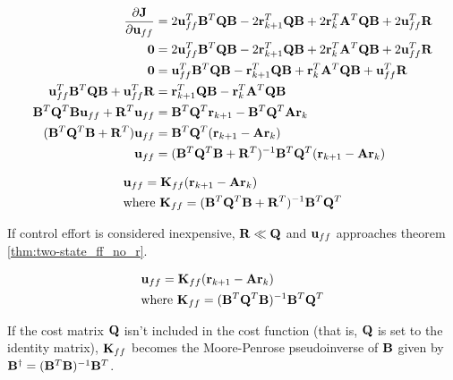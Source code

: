 \begin{align*}
  \frac{\partial\mathbf{J}}{\partial\mathbf{u}_{ff}} &=
    2\mathbf{u}_{ff}^T\mathbf{B}^T\mathbf{Q}\mathbf{B} - 2\mathbf{r}_{k+1}^T\mathbf{Q}\mathbf{B} +
    2\mathbf{r}_k^T\mathbf{A}^T\mathbf{Q}\mathbf{B} + 2\mathbf{u}_{ff}^T\mathbf{R} \\
  \mathbf{0} &= 2\mathbf{u}_{ff}^T\mathbf{B}^T\mathbf{Q}\mathbf{B} -
    2\mathbf{r}_{k+1}^T\mathbf{Q}\mathbf{B} + 2\mathbf{r}_k^T\mathbf{A}^T\mathbf{Q}\mathbf{B} +
    2\mathbf{u}_{ff}^T\mathbf{R} \\
  \mathbf{0} &= \mathbf{u}_{ff}^T\mathbf{B}^T\mathbf{Q}\mathbf{B} -
    \mathbf{r}_{k+1}^T\mathbf{Q}\mathbf{B} + \mathbf{r}_k^T\mathbf{A}^T\mathbf{Q}\mathbf{B} +
    \mathbf{u}_{ff}^T\mathbf{R} \\
  \mathbf{u}_{ff}^T\mathbf{B}^T\mathbf{Q}\mathbf{B} + \mathbf{u}_{ff}^T\mathbf{R} &=
    \mathbf{r}_{k+1}^T\mathbf{Q}\mathbf{B} - \mathbf{r}_k^T\mathbf{A}^T\mathbf{Q}\mathbf{B} \\
  \mathbf{B}^T\mathbf{Q}^T\mathbf{B}\mathbf{u}_{ff} + \mathbf{R}^T\mathbf{u}_{ff} &=
    \mathbf{B}^T\mathbf{Q}^T\mathbf{r}_{k+1} - \mathbf{B}^T\mathbf{Q}^T\mathbf{A}\mathbf{r}_k \\
  (\mathbf{B}^T\mathbf{Q}^T\mathbf{B} + \mathbf{R}^T)\mathbf{u}_{ff} &=
    \mathbf{B}^T\mathbf{Q}^T(\mathbf{r}_{k+1} - \mathbf{A}\mathbf{r}_k) \\
  \mathbf{u}_{ff} &= (\mathbf{B}^T\mathbf{Q}^T\mathbf{B} +
    \mathbf{R}^T)^{-1}\mathbf{B}^T\mathbf{Q}^T(\mathbf{r}_{k+1} - \mathbf{A}\mathbf{r}_k)
\end{align*}

\begin{theorem}
  \begin{align}
    &\mathbf{u}_{ff} = \mathbf{K}_{ff} (\mathbf{r}_{k+1} - \mathbf{A}\mathbf{r}_k) \\
    &\text{where } \mathbf{K}_{ff} =
      (\mathbf{B}^T\mathbf{Q}^T\mathbf{B} + \mathbf{R}^T)^{-1}\mathbf{B}^T\mathbf{Q}^T
  \end{align}
  \label{thm:two-state_ff}
\end{theorem}

If control effort is considered inexpensive, $\mathbf{R} \ll \mathbf{Q}$ and
$\mathbf{u}_{ff}$ approaches theorem \ref{thm:two-state_ff_no_r}.

\begin{theorem}
  \begin{align}
    &\mathbf{u}_{ff} = \mathbf{K}_{ff} (\mathbf{r}_{k+1} - \mathbf{A}\mathbf{r}_k) \\
    &\text{where } \mathbf{K}_{ff} =
      (\mathbf{B}^T\mathbf{Q}^T\mathbf{B})^{-1}\mathbf{B}^T\mathbf{Q}^T
  \end{align}
  \label{thm:two-state_ff_no_r}
\end{theorem}

\begin{remark}
  If the cost matrix $\mathbf{Q}$ isn't included in the cost function (that is,
  $\mathbf{Q}$ is set to the identity matrix), $\mathbf{K}_{ff}$ becomes the
  Moore-Penrose pseudoinverse of $\mathbf{B}$ given by
  $\mathbf{B}^\dagger = (\mathbf{B}^T\mathbf{B})^{-1}\mathbf{B}^T$.
\end{remark}
